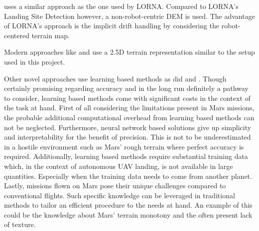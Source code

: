 \citep{Johnson2005VisionGuided} uses a similar approach as the one used by LORNA. Compared to LORNA's Landing Site Detection \citep{LSD1,LSD2} however, a non-robot-centric DEM is used. The advantage of LORNA's approach is the implicit drift handling by considering the robot-centered terrain map.

Modern approaches like \citep{Fankhauser2014RobotCentric, Forster2015Continuous} and \citep{Daftry2018Robust} use a 2.5D terrain representation similar to the setup used in this project.

Other novel approaches use learning based methods as did \citep{Neves2024Multimodal, Abdollahzadeh2022SafeLandingZones} and \citep{TovanchePicon2024RealTimeSafeValidation}. Though certainly promising regarding accuracy and in the long run definitely a pathway to consider, learning based methods come with significant costs in the context of the task at hand. First of all considering the limitations present in Mars missions, the probable additional computational overhead from learning based methods can not be neglected. Furthermore, neural network based solutions give up simplicity and interpretability for the benefit of precision. This is not to be underestimated in a hostile environment such as Mars' rough terrain where perfect accuracy is required. Additionally, learning based methods require substantial training data which, in the context of autonomous UAV landing, is not available in large quantities. Especially when the training data needs to come from another planet. Lastly, missions flown on Mars pose their unique challenges compared to conventional flights. Such specific knowledge can be leveraged in traditional methods to tailor an efficient procedure to the needs at hand. An example of this could be the knowledge about Mars' terrain monotony and the often present lack of texture.

% 